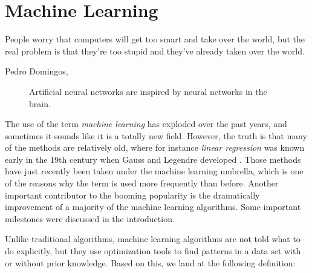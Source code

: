 \chapter{Machine Learning} \label{chp:machinelearning}
\epigraph{People worry that computers will get too smart and take over the world, but the real problem is that they're too stupid and they've already taken over the world.}{Pedro Domingos, \cite{domingos_master_2015}}
\begin{figure}[H]
	\centering
	\caption{Artificial neural networks are inspired by neural networks in the brain.}
\end{figure}

The use of the term \textit{machine learning} has exploded over the past years, and sometimes it sounds like it is a totally new field. However, the truth is that many of the methods are relatively old, where for instance \textit{linear regression} was known early in the 19th century when Gauss and Legendre developed  \cite{legendre_nouvelles_1805, gauss_theoria_1809}. Those methods have just recently been taken under the machine learning umbrella, which is one of the reasons why the term is used more frequently than before. Another important contributor to the booming popularity is the dramatically improvement of a majority of the machine learning algorithms. Some important milestones were discussed in the introduction. 

Unlike traditional algorithms, machine learning algorithms are not told what to do explicitly, but they use optimization tools to find patterns in a data set with or without prior knowledge. Based on this, we land at the following definition:

